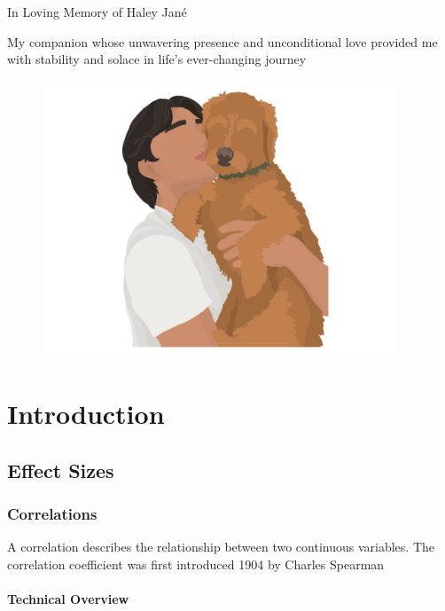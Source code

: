 \documentclass[
  letterpaper,
  DIV=11,
  numbers=noendperiod]{scrreprt}
\begin{document}
In Loving Memory of Haley Jané

My companion whose unwavering presence and unconditional love provided
me with stability and solace in life's ever-changing journey

\begin{figure}

{\centering \includegraphics[width=4.16667in,height=\textheight]{figure/dedication_2.png}

}

\end{figure}


\hypertarget{introduction}{%
\chapter{Introduction}\label{introduction}}

\hypertarget{effect-sizes}{%
\section{Effect Sizes}\label{effect-sizes}}

\hypertarget{correlations}{%
\subsection{Correlations}\label{correlations}}

A correlation describes the relationship between two continuous
variables. The correlation coefficient was first introduced 1904 by
Charles Spearman

\hypertarget{technical-overview}{%
\subsubsection*{Technical Overview}\label{technical-overview}}
\end{document}

